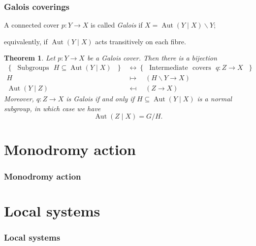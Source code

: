 \documentclass[notheorems, hyperref={backref}]{beamer}
\newtheorem{thm}{Theorem}
\DeclareMathOperator{\Aut}{Aut}
\begin{document}
\begin{frame}
    \frametitle{Galois coverings}
    A connected cover $p\colon Y\to X$ is called \textit{Galois} if $X=\Aut(Y\mid X)\backslash Y$;
    \pause

    equivalently, if $\Aut(Y\mid X)$ acts transitively on each fibre.
    \pause

    \begin{thm}
	Let $p\colon Y\to X$ be a Galois cover.
	Then there is a bijection
	\begin{align*}
	    \left\{ \mbox{ }\mathrm{Subgroups}\mbox{ }H\subseteq \Aut(Y\mid X) \mbox{ } \right\} & \leftrightarrow \left\{ \mbox{ }\mathrm{Intermediate} \mbox{ }\mathrm{covers} \mbox{ }q\colon Z\to X \mbox{ }\right\} \\
	    H \quad  & \mapsto	\quad \left( H\backslash Y\to X\right) \\
	    \Aut(Y\mid Z) \quad & \mapsfrom \quad \left( Z\to X\right)
	\end{align*}
	Moreover, $q\colon Z\to X$ is Galois if and only if $H\subseteq \Aut(Y\mid X)$ is a normal subgroup, in which case we have
	\[ \Aut(Z\mid X)=G/H . \]
    \end{thm}
\end{frame}

\section{Monodromy action}
\begin{frame}
    \frametitle{Monodromy action}
\end{frame}

\section{Local systems}
\begin{frame}
    \frametitle{Local systems}
\end{frame}
\end{document}
